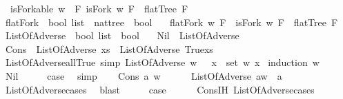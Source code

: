 \begin{isabellebody}
\ \ {\isachardoublequoteopen}isForkable\ w\ {\isacharequal}\ {\isacharparenleft}{\isasymexists}F{\isachardot}\ isFork\ w\ F\ {\isasymand}\ flatTree\ F{\isacharparenright}{\isachardoublequoteclose}\isanewline
\ \ \isanewline
{}\isamarkupfalse%
\ flatFork\ {\isacharcolon}{\isacharcolon}\ {\isachardoublequoteopen}bool\ list\ {\isasymRightarrow}\ nattree\ {\isasymRightarrow}\ bool{\isachardoublequoteclose}\ \isanewline
\ \ {\isachardoublequoteopen}flatFork\ w\ F\ {\isacharequal}\ {\isacharparenleft}isFork\ w\ F\ {\isasymand}\ flatTree\ F{\isacharparenright}{\isachardoublequoteclose}\isanewline
\isanewline
{}\isamarkupfalse%
\ ListOfAdverse\ {\isacharcolon}{\isacharcolon}\ {\isachardoublequoteopen}bool\ list\ {\isasymRightarrow}\ bool{\isachardoublequoteclose}\ \isanewline
\ \ Nil\ {\isacharcolon}\ {\isachardoublequoteopen}ListOfAdverse\ {\isacharbrackleft}{\isacharbrackright}{\isachardoublequoteclose}\ \ \isanewline
{\isacharbar}\ Cons\ {\isacharcolon}\ {\isachardoublequoteopen}ListOfAdverse\ xs\ {\isasymLongrightarrow}\ ListOfAdverse\ {\isacharparenleft}True{\isacharhash}xs{\isacharparenright}{\isachardoublequoteclose}\isanewline
\ \ \isanewline
{}\isamarkupfalse%
\ ListOfAdverse{\isacharunderscore}all{\isacharunderscore}True\ {\isacharbrackleft}simp{\isacharbrackright}{\isacharcolon}\ {\isachardoublequoteopen}ListOfAdverse\ w\ {\isasymlongrightarrow}\ {\isacharparenleft}{\isasymforall}\ x\ {\isasymin}\ set\ w{\isachardot}\ x{\isacharparenright}{\isachardoublequoteclose}\isanewline
%
\isadelimproof
%
\endisadelimproof
%
\isatagproof
{}\isamarkupfalse%
\ {\isacharparenleft}induction\ w{\isacharparenright}\isanewline
\ \ \isamarkupfalse%
\ Nil\isanewline
\ \ \isamarkupfalse%
\ \isamarkupfalse%
\ {\isacharquery}case\ \isamarkupfalse%
\ simp\isanewline
{}\isamarkupfalse%
\isanewline
\ \ \isamarkupfalse%
\ {\isacharparenleft}Cons\ a\ w{\isacharparenright}\isanewline
\ \ \ \ \isamarkupfalse%
\ {\isachardoublequoteopen}ListOfAdverse\ {\isacharparenleft}a{\isacharhash}w{\isacharparenright}\ {\isasymlongrightarrow}\ a{\isachardoublequoteclose}\isanewline
\ \ \ \ \ \ \isamarkupfalse%
\ ListOfAdverse{\isachardot}cases\ \isamarkupfalse%
\ blast\isanewline
\ \ \isamarkupfalse%
\ \isamarkupfalse%
\ {\isacharquery}case\isanewline
\ \ \ \ \isamarkupfalse%
\ Cons{\isachardot}IH\ ListOfAdverse{\isachardot}cases\ \isamarkupfalse%

\end{isabellebody}
